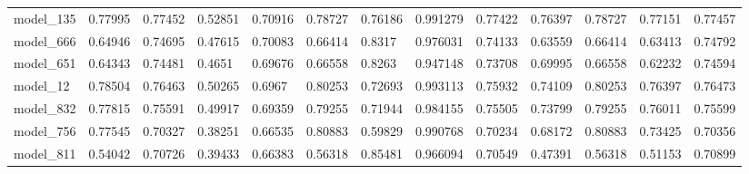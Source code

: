 \begin{tabular}{lllllllllllll}
model\_135 & 0.77995 & 0.77452 & 0.52851 & 0.70916 & 0.78727     & 0.76186     & 0.991279 & 0.77422  & 0.76397   & 0.78727 & 0.77151 & 0.77457 \\
model\_666 & 0.64946 & 0.74695 & 0.47615 & 0.70083 & 0.66414     & 0.8317      & 0.976031 & 0.74133  & 0.63559   & 0.66414 & 0.63413 & 0.74792 \\
model\_651 & 0.64343 & 0.74481 & 0.4651  & 0.69676 & 0.66558     & 0.8263      & 0.947148 & 0.73708  & 0.69995   & 0.66558 & 0.62232 & 0.74594 \\
model\_12  & 0.78504 & 0.76463 & 0.50265 & 0.6967  & 0.80253     & 0.72693     & 0.993113 & 0.75932  & 0.74109   & 0.80253 & 0.76397 & 0.76473 \\
model\_832 & 0.77815 & 0.75591 & 0.49917 & 0.69359 & 0.79255     & 0.71944     & 0.984155 & 0.75505  & 0.73799   & 0.79255 & 0.76011 & 0.75599 \\
model\_756 & 0.77545 & 0.70327 & 0.38251 & 0.66535 & 0.80883     & 0.59829     & 0.990768 & 0.70234  & 0.68172   & 0.80883 & 0.73425 & 0.70356 \\
model\_811 & 0.54042 & 0.70726 & 0.39433 & 0.66383 & 0.56318     & 0.85481     & 0.966094 & 0.70549  & 0.47391   & 0.56318 & 0.51153 & 0.70899
\end{tabular}